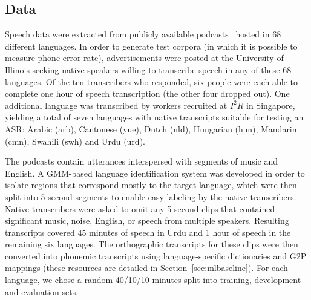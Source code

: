 \subsection{Data}
\label{sec:data}

Speech data were extracted from publicly available podcasts~\cite{SBS}
hosted in 68 different languages.  In order to generate test corpora
(in which it is possible to measure phone error rate), advertisements
were posted at the University of Illinois seeking native speakers
willing to transcribe speech in any of these 68 languages.  Of the ten
transcribers who responded, six people were each able to complete one
hour of speech transcription (the other four dropped out).  One
additional language was transcribed by workers recruited at $I^2R$ in
Singapore, yielding a total of seven languages with native
transcripts suitable for testing an ASR: Arabic (arb), Cantonese
(yue), Dutch (nld), Hungarian (hun), Mandarin (cmn), Swahili (swh) and
Urdu (urd).

The podcasts contain utterances interspersed with segments of music
and English. A GMM-based language identification system was
developed in order to isolate
regions that correspond mostly to the target language, which
were then split into 5-second
segments to enable easy labeling by the native transcribers.
Native transcribers were asked to omit any 5-second
clips that contained significant music, noise, English,
or speech from multiple speakers. Resulting transcripts
covered 45 minutes of speech in Urdu and 1
hour of speech in the remaining six languages. The orthographic
transcripts for these clips were then converted into phonemic
transcripts using language-specific dictionaries and G2P mappings
(these resources are detailed in Section~\ref{sec:mlbaseline}). For
each language, we chose a random 40/10/10 minutes split into training,
development and evaluation sets.
